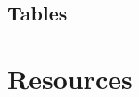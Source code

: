 \documentclass[11pt,letterpaper]{article}
\numberwithin{equation}{section} %
\numberwithin{figure}{section} %
\numberwithin{table}{section} %
\begin{document}

\subsection{Tables} 


\clearpage
\appendix
\section{Resources}



\clearpage
\end{document}
